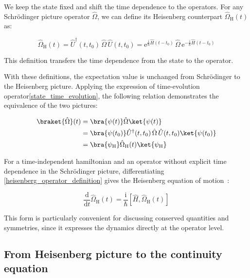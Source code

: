 We keep the state fixed and shift the time dependence to the operators.
For any Schrödinger picture operator $\hat{\Omega}$, we can define its Heisenberg counterpart $\hat{\Omega}_\mathrm{H}(t)$ as:

\begin{equation}
    \hat\Omega_\mathrm{H}(t)
    =\hat{U}^\dagger(t,t_0)\,\hat{\Omega}\,\hat{U}(t,t_0)
    =\mathrm{e}^{\frac{\mathrm{i}}{\hbar}\hat{H}(t-t_0)}\,\hat{\Omega}\,\mathrm{e}^{-\frac{\mathrm{i}}{\hbar}\hat{H}(t-t_0)}
\label{heisenberg_operator_definition}
\end{equation}

This definition transfers the time dependence from the state to the operator.

With these definitions, the expectation value is unchanged from Schrödinger to the Heisenberg picture.
Applying the expression of time-evolution operator\eqref{state_time_evolution},
the following relation demonstrates the equivalence of the two pictures:

\begin{equation}
\begin{aligned}
    \braket{\hat{\Omega}}(t)&=\bra{\psi(t)}\hat{\Omega}\ket{\psi(t)}\\
    &=\bra{\psi(t_0)}\hat{U}^\dagger(t,t_0)\,\hat{\Omega}\,\hat{U}(t,t_0)\ket{\psi(t_0)} \\
    &=\bra{\psi_\mathrm{H}}\hat{\Omega}_\mathrm{H}(t)\ket{\psi_\mathrm{H}}
\end{aligned}
\label{equivalence_schrodinger_heisenberg}
\end{equation}

For a time-independent hamiltonian and an operator without explicit time dependence in the Schrödinger picture, differentiating \eqref{heisenberg_operator_definition} gives the Heisenberg equation of motion~\cite{shankar2012principles}:

\begin{equation}
    \frac{\mathrm{d}}{\mathrm{d}t}\hat{\Omega}_\mathrm{H}(t)
    =\frac{\mathrm{i}}{\hbar}\left[\hat{H},\hat{\Omega}_\mathrm{H}(t)\right]
\label{heisenberg_equation_of_motion}
\end{equation}

This form is particularly convenient for discussing conserved quantities and symmetries, since it expresses the dynamics directly at the operator level.

\subsection{From Heisenberg picture to the continuity equation}

